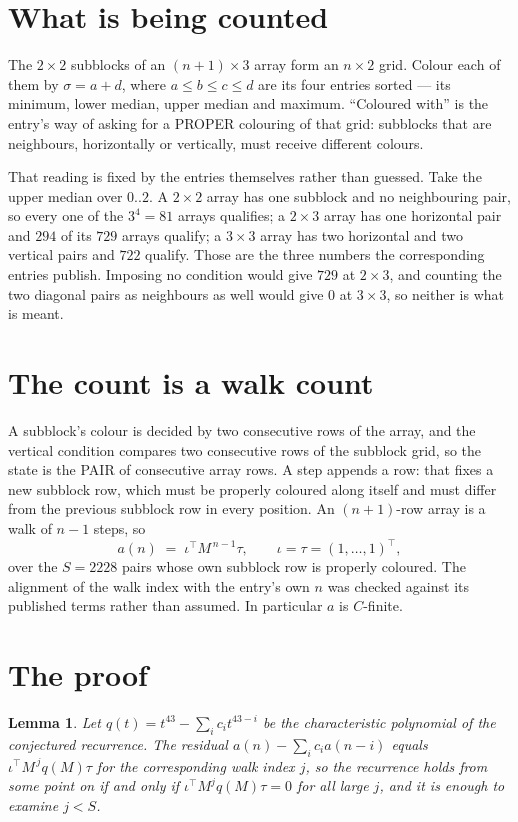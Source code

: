 \documentclass[11pt,a4paper]{article}
\theoremstyle{plain}
\newtheorem{lemma}[theorem]{Lemma}
\theoremstyle{definition}
\begin{document}
\section{What is being counted}

The $2\times2$ subblocks of an $(n+1)\times3$ array form an
$n\times2$ grid. Colour each of them by $\sigma=a+d$, where $a\le b\le c\le d$ are its four entries sorted --- its minimum, lower median, upper median and maximum. ``Coloured with'' is the entry's way of
asking for a PROPER colouring of that grid: subblocks that are neighbours, horizontally or
vertically, must receive different colours.

That reading is fixed by the entries themselves rather than guessed. Take the upper median
over $0..2$. A $2\times2$ array has one subblock and no neighbouring pair, so every one of the
$3^4=81$ arrays qualifies; a $2\times3$ array has one horizontal pair and $294$ of its $729$
arrays qualify; a $3\times3$ array has two horizontal and two vertical pairs and $722$
qualify. Those are the three numbers the corresponding entries publish. Imposing no condition
would give $729$ at $2\times3$, and counting the two diagonal pairs as neighbours as well
would give $0$ at $3\times3$, so neither is what is meant.

\section{The count is a walk count}

A subblock's colour is decided by two consecutive rows of the array, and
the vertical condition compares two consecutive rows of the subblock grid, so the state is the
PAIR of consecutive array rows. A step appends a row: that fixes a new subblock row, which
must be properly coloured along itself and must differ from the previous subblock row in every
position. An $(n+1)$-row array is a walk of $n-1$ steps, so
\[
a(n)\;=\;\iota^{\!\top}M^{\,n-1}\tau,\qquad\iota=\tau=(1,\dots,1)^{\!\top},
\]
over the $S=2228$ pairs whose own subblock row is properly coloured.
The alignment of the walk index with the entry's own $n$ was checked against its published
terms rather than assumed. In particular $a$ is $C$-finite.

\section{The proof}

\begin{lemma}\label{lem:crit}
Let $q(t)=t^{43}-\sum_i c_it^{43-i}$ be the characteristic polynomial of the
conjectured recurrence. The residual $a(n)-\sum_ic_ia(n-i)$ equals
$\iota^{\!\top}M^{\,j}q(M)\tau$ for the corresponding walk index $j$, so the recurrence
holds from some point on if and only if $\iota^{\!\top}M^{j}q(M)\tau=0$ for all large $j$,
and it is enough to examine $j<S$.
\end{lemma}
\end{document}
